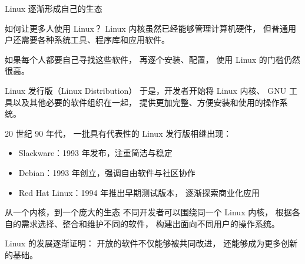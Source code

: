 \documentclass[aspectratio=169]{beamer}
\begin{document}
\begin{frame}[t]{Linux 逐渐形成自己的生态}
	
	\begin{block}{如何让更多人使用 Linux？}
		\hspace*{2em}Linux 内核虽然已经能够管理计算机硬件，
		但普通用户还需要各种系统工具、程序库和应用软件。
		
		\par\hspace*{2em}如果每个人都要自己寻找这些软件，
		再逐个安装、配置，
		使用 Linux 的门槛仍然很高。
	\end{block}
	
	\vspace{0.3cm}
	
	\begin{block}{Linux 发行版（Linux Distribution）}
		\hspace*{2em}于是，开发者开始将 Linux 内核、
		GNU 工具以及其他必要的软件组织在一起，
		提供更加完整、方便安装和使用的操作系统。
		
		\par\hspace*{2em}20 世纪 90 年代，
		一批具有代表性的 Linux 发行版相继出现：
		
		\begin{itemize}
			\item Slackware：1993 年发布，注重简洁与稳定
			\item Debian：1993 年创立，强调自由软件与社区协作
			\item Red Hat Linux：1994 年推出早期测试版本，
			逐渐探索商业化应用
		\end{itemize}
	\end{block}
	
	\vspace{0.3cm}
	
	\begin{block}{从一个内核，到一个庞大的生态}
		\hspace*{2em}不同开发者可以围绕同一个 Linux 内核，
		根据各自的需求选择、整合和维护不同的软件，
		构建出面向不同用户的操作系统。
		
		\par\hspace*{2em}\alert{Linux 的发展逐渐证明：
			开放的软件不仅能够被共同改进，
			还能够成为更多创新的基础。}
	\end{block}
	
\end{frame}
\end{document}
